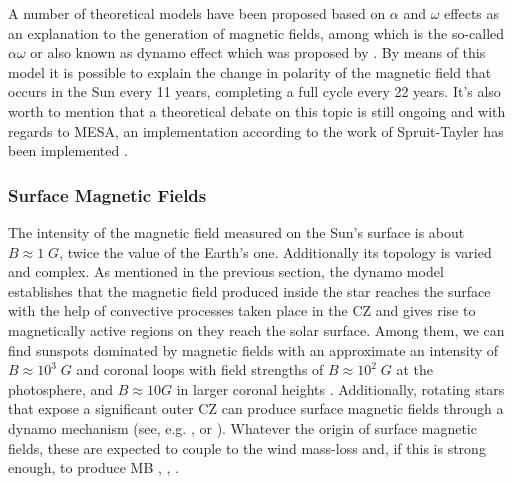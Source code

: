 \documentclass[fleqn,usenatbib]{mnras}
\begin{document}
A number of theoretical models have been proposed based on $\alpha$ and $\omega$ effects as an explanation to the generation of magnetic fields, among which is the so-called $\alpha\omega$ or also known as dynamo effect which was proposed by \citet{Spruit2002}. By means of this model it is possible to explain the change in polarity of the magnetic field that occurs in the Sun every 11 years, completing a full cycle every 22 years. It's also worth to mention that a theoretical debate on this topic is still ongoing \citep{Denissenkov2007} and with regards to MESA, an implementation according to the work of Spruit-Tayler has been implemented \citep{Paxton2013}.\par

\subsubsection{Surface Magnetic Fields} \label{surf_mf}
The intensity of the magnetic field measured on the Sun's surface is about $B\approx1\; G$, twice the value of the Earth's one. Additionally its topology is varied and complex. As mentioned in the previous section, the dynamo model establishes that the magnetic field produced inside the star reaches the surface with the help of convective processes taken place in the CZ and gives rise to magnetically active regions on they reach the solar surface. Among them, we can find sunspots dominated by magnetic fields with an approximate an intensity of $B\approx10^3\; G$ and coronal loops with field strengths of $B\approx10^2\; G$ at the photosphere, and $B\approx10 G$ in larger coronal heights \citep{Aschwanden2014}. Additionally, rotating stars that expose a significant outer CZ can produce surface magnetic fields through a dynamo mechanism (see, e.g. \citet{Brandenburg2004}, \citet{Charbonneau2010} or \citet{Brun2017}). Whatever the origin of surface magnetic fields, these are expected to couple to the wind mass-loss and, if this is strong enough, to produce MB \citet{UdDoula2002}, \citet{Ud-Doula2007}, \citet{Ud-Doula2008} \citet{Meynet2010}.\par
\end{document}
